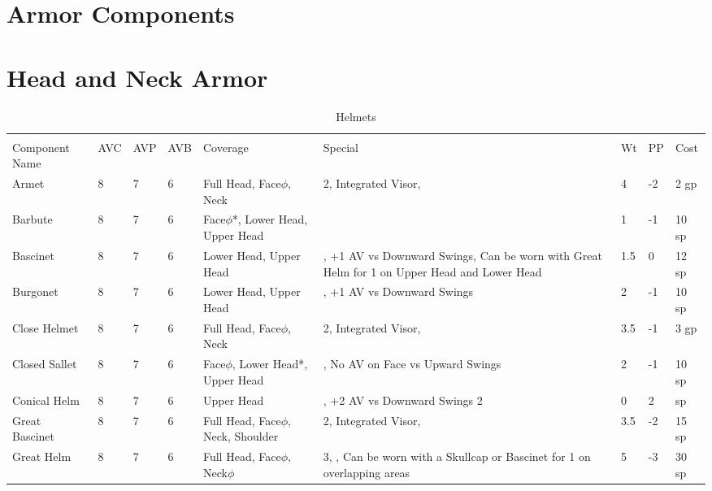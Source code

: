 \documentclass[oneside,11pt,english]{book}
\begin{document}
\section*{Armor Components}
\section{Head and Neck Armor}\label{sec:Head and Neck Armor}
\begin{longtabu}to 
	\captionsetup{textformat=empty, labelformat=blank}
	\caption{Helmets} \vspace{-15pt}
	\label{tab:Helmets}\\
Component Name&AVC&AVP&AVB& Coverage& Special& Wt&PP& Cost\\\toprule
Armet& 8& 7& 6& Full Head, Face\hyperref[sec:Weak Spots]{$\phi$}, Neck & 2, Integrated Visor, & 4& -2& 2 gp\\
Barbute& 8& 7& 6& Face\hyperref[sec:Weak Spots]{$\phi$}*, Lower Head, Upper Head && 1 &-1& 10 sp\\
Bascinet& 8& 7& 6& Lower Head, Upper Head &, +1 AV vs Downward Swings, Can be worn with Great Helm for  1 on Upper Head and Lower Head& 1.5& 0& 12 sp\\
Burgonet& 8& 7& 6& Lower Head, Upper Head &, +1 AV vs Downward Swings &2 &-1& 10 sp\\
Close Helmet& 8& 7& 6& Full Head, Face\hyperref[sec:Weak Spots]{$\phi$}, Neck & 2, Integrated Visor, & 3.5 &-1& 3 gp\\
Closed Sallet& 8& 7& 6& Face\hyperref[sec:Weak Spots]{$\phi$}, Lower Head*, Upper Head &, No AV on Face vs Upward Swings &2 &-1& 10 sp\\
Conical Helm& 8& 7& 6& Upper Head &, +2 AV vs Downward Swings 2& 0& 2& sp\\
Great Bascinet& 8& 7& 6& Full Head, Face\hyperref[sec:Weak Spots]{$\phi$}, Neck, Shoulder & 2, Integrated Visor, & 3.5 &-2& 15 sp\\
Great Helm& 8& 7& 6& Full Head, Face\hyperref[sec:Weak Spots]{$\phi$}, Neck\hyperref[sec:Weak Spots]{$\phi$} & 3, , Can be worn with a Skullcap or Bascinet for  1 on overlapping areas& 5 &-3& 30 sp\\

\end{longtabu}
\end{document}

